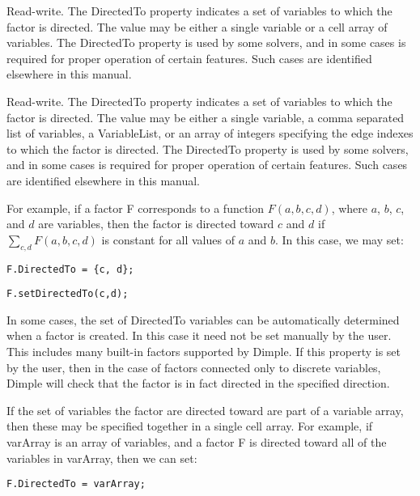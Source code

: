 \label{sec:Factor.DirectedTo}

\ifmatlab
Read-write.  The DirectedTo property indicates a set of variables to which the factor is directed.  The value may be either a single variable or a cell array of variables.  The DirectedTo property is used by some solvers, and in some cases is required for proper operation of certain features.  Such cases are identified elsewhere in this manual.
\fi

\ifjava
Read-write.  The DirectedTo property indicates a set of variables to which the factor is directed.  The value may be either a single variable, a comma separated list of variables, a VariableList, or an array of integers specifying the edge indexes to which the factor is directed.  The DirectedTo property is used by some solvers, and in some cases is required for proper operation of certain features.  Such cases are identified elsewhere in this manual.
\fi

For example, if a factor F corresponds to a function $F(a, b, c, d)$, where $a$, $b$, $c$, and $d$ are variables, then the factor is directed toward $c$ and $d$ if $\sum_{c, d} F(a, b, c, d)$ is constant for all values of $a$ and $b$.  In this case, we may set:

\ifmatlab
\begin{lstlisting}
F.DirectedTo = {c, d};
\end{lstlisting}
\fi

\ifjava
\begin{lstlisting}
F.setDirectedTo(c,d);
\end{lstlisting}
\fi

In some cases, the set of DirectedTo variables can be automatically determined when a factor is created.  In this case it need not be set manually by the user.  This includes many built-in factors supported by Dimple.  If this property is set by the user, then in the case of factors connected only to discrete variables, Dimple will check that the factor is in fact directed in the specified direction.

\ifmatlab
If the set of variables the factor are directed toward are part of a variable array, then these may be specified together in a single cell array.  For example, if varArray is an array of variables, and a factor F is directed toward all of the variables in varArray, then we can set:

\begin{lstlisting}
F.DirectedTo = varArray;
\end{lstlisting}

